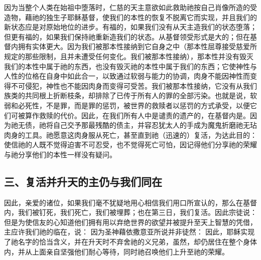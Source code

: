 因为当整个人类在始祖中堕落时，仁慈的天主意欲如此救助祂按自己肖像所造的受造物，藉祂的独生子耶稣基督，使我们的本性的恢复不脱离它而实现，并且我们的新状态应是对原始地位的进步。有福的，如果我们没有从天主造我们的状态堕落；但更有福的，如果我们保持祂重新造我们的状态。从基督领受形式是大的；但在基督内拥有实体更大。因为我们被那本性接纳到它自身之中（那本性屈尊接受慈爱所规定的那些限制，且并未遭受任何变化。我们被那本性接纳），那本性并没有毁灭我们的本性中属于祂的东西，也没有毁灭祂的本性中属于我们的东西；它使神性与人性的位格在自身中如此合一，以致通过软弱与能力的协调，肉身不能因神性而变得不可侵犯，神性也不能因肉身而变得可受苦。我们被那本性接纳，它没有从我们族类的共同根上折断枝条，却排除了已传于所有人的罪的全部污染。也就是说，软弱和必死性，不是罪，而是罪的惩罚，被世界的救赎者以惩罚的方式承受，以便它们可被算作救赎的代价。因此，在我们所有人中是谴责的遗产的，在基督内是。因为祂无债，祂将自己交予那最残酷的债主，并容忍犹太人的手成为魔鬼折磨祂无玷肉身的工具。祂愿意这肉身服从死亡，甚至直到祂（迅速的）复活，为达此目的：使信祂的人既不觉得迫害不可忍受，也不觉得死亡可怕，因记得他们分享祂的荣耀与祂分享他们的本性一样没有疑问。\par


\subsection{三、复活并升天的主仍与我们同在}

因此，亲爱的诸位，如果我们毫不犹疑地用心相信我们用口所宣认的，那么在基督内，我们被钉死，我们死亡，我们被埋葬；也在第三日，我们复活。因此宗徒说：  但是为使信友的心知道他们拥有用以弃绝世界的欲望并被提升至天上智慧的凭借，主应许我们祂的临在，说：  因为圣神藉依撒意亚所说并非徒然： 因此，耶稣实现了祂名字的恰当含义，并在升天时不弃舍祂的义兄弟，虽然，却仍居住在整个身体内，并从上面亲自坚强他们耐心等待，同时祂召唤他们上升至祂的荣耀。\par


